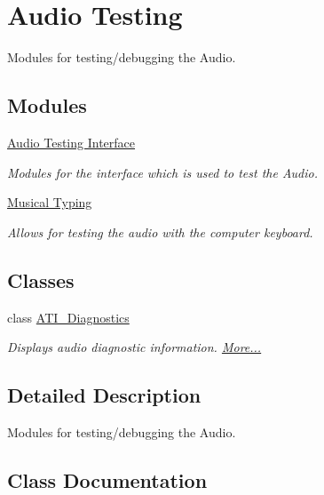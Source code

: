 \hypertarget{group___audio_testing}{}\section{Audio Testing}
\label{group___audio_testing}


Modules for testing/debugging the Audio.  


\subsection*{Modules}
\begin{DoxyCompactItemize}
\item 
\hyperlink{group___doc_a_t_i}{Audio Testing Interface}
\begin{DoxyCompactList}\small\item\em Modules for the interface which is used to test the Audio. \end{DoxyCompactList}\item 
\hyperlink{group___mus_typ}{Musical Typing}
\begin{DoxyCompactList}\small\item\em Allows for testing the audio with the computer keyboard. \end{DoxyCompactList}\end{DoxyCompactItemize}
\subsection*{Classes}
\begin{DoxyCompactItemize}
\item 
class \hyperlink{group___audio_testing_class_a_t_i___diagnostics}{A\+T\+I\+\_\+\+Diagnostics}
\begin{DoxyCompactList}\small\item\em Displays audio diagnostic information.  \hyperlink{group___audio_testing_class_a_t_i___diagnostics}{More...}\end{DoxyCompactList}\end{DoxyCompactItemize}


\subsection{Detailed Description}
Modules for testing/debugging the Audio. 



\subsection{Class Documentation}
\label{class_a_t_i___diagnostics}
